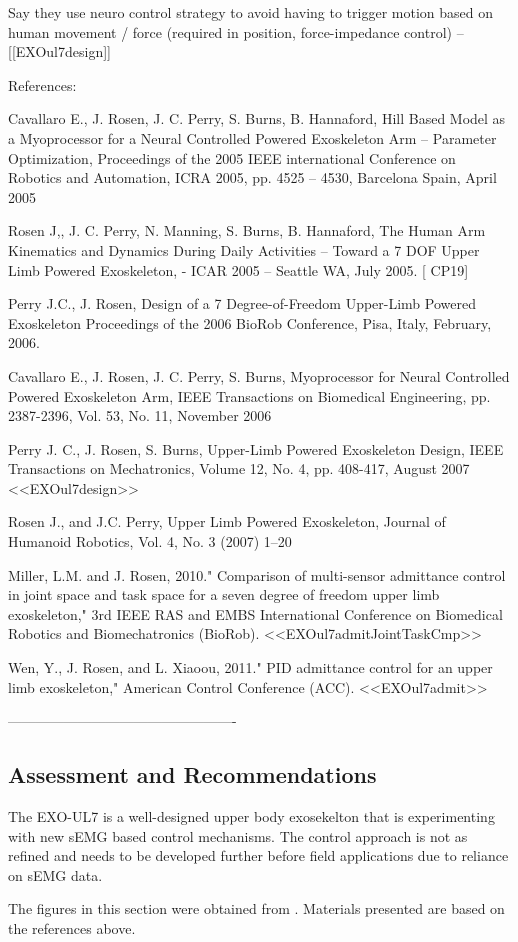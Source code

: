 Say they use neuro control strategy to avoid having to trigger motion based on human movement / force (required in position, force-impedance control) -- [[EXOul7design]]


References:

Cavallaro E., J. Rosen, J. C. Perry, S. Burns, B. Hannaford, Hill Based Model as a Myoprocessor for a Neural Controlled Powered Exoskeleton Arm – Parameter Optimization, Proceedings of the 2005 IEEE international Conference on Robotics and Automation, ICRA 2005, pp. 4525 – 4530, Barcelona Spain, April 2005

Rosen J,, J. C. Perry, N. Manning, S. Burns, B. Hannaford, The Human Arm Kinematics and Dynamics During Daily Activities – Toward a 7 DOF Upper Limb Powered Exoskeleton, - ICAR 2005 – Seattle WA, July 2005. [ CP19]

Perry J.C., J. Rosen, Design of a 7 Degree-of-Freedom Upper-Limb Powered Exoskeleton Proceedings of the 2006 BioRob Conference, Pisa, Italy, February, 2006.

Cavallaro E., J. Rosen, J. C. Perry, S. Burns, Myoprocessor for Neural Controlled Powered Exoskeleton Arm, IEEE Transactions on Biomedical Engineering, pp. 2387-2396, Vol. 53, No. 11, November 2006

Perry J. C., J. Rosen, S. Burns, Upper-Limb Powered Exoskeleton Design, IEEE Transactions on Mechatronics, Volume 12, No. 4, pp. 408-417, August 2007 <<EXOul7design>>

Rosen J., and J.C. Perry, Upper Limb Powered Exoskeleton, Journal of Humanoid Robotics, Vol. 4, No. 3 (2007) 1–20

Miller, L.M. and J. Rosen, 2010." Comparison of multi-sensor admittance control in joint space and task space for a seven degree of freedom upper
limb exoskeleton," 3rd IEEE RAS and EMBS International Conference on Biomedical Robotics and Biomechatronics (BioRob). <<EXOul7admitJointTaskCmp>>

Wen, Y., J. Rosen, and L. Xiaoou, 2011." PID admittance control for an upper limb exoskeleton," American Control Conference (ACC).  <<EXOul7admit>>

-------------------------------------------------

\subsection{Assessment and Recommendations}

The EXO-UL7 is a well-designed upper body exosekelton that is experimenting with new sEMG based control mechanisms.  The control approach is not as refined and needs to be developed further before field applications due to reliance on sEMG data.  


The figures in this section were obtained from \cite{EXOul7design2007,EXOul7pidAdmit2011}.  Materials presented are based on the references above.
